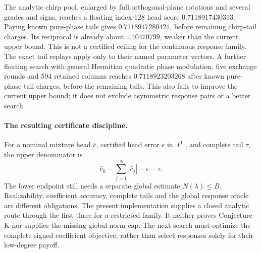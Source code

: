The analytic chirp pool, enlarged by full orthogonal-plane rotations
and several grades and signs, reaches a floating index-128 head score
$0.7118917430313$. Paying known pure-phase tails gives
$0.7118917280421$, before remaining chirp-tail charges. Its reciprocal
is already about $1.40470799$, weaker than the current upper bound.
This is not a certified ceiling for the continuous response family.
The exact tail replays apply only to their named parameter vectors.
A further floating search with general Hermitian quadratic phase
modulation, five exchange rounds and 594 retained columns reaches
$0.7118923203268$ after known pure-phase tail charges, before the
remaining tails. This also fails to improve the current upper bound;
it does not exclude asymmetric response pairs or a better search.

\paragraph{The resulting certificate discipline.}
For a nominal mixture head $\widehat c$, certified head error
$\epsilon$ in $\ell^1$, and complete tail $\tau$, the upper denominator
is
\[
 \widehat c_0-\sum_{j=1}^N|\widehat c_j|-\epsilon-\tau.
\]
The lower endpoint still needs a separate global estimate
$N(\lambda)\le B$. Realizability, coefficient accuracy, complete tails
and the global response oracle are different obligations.
The present implementation supplies a closed analytic route through
the first three for a restricted family. It neither proves
Conjecture K nor supplies the missing global norm cap. The next
search must optimize the complete signed coefficient objective,
rather than select responses solely for their low-degree payoff.





